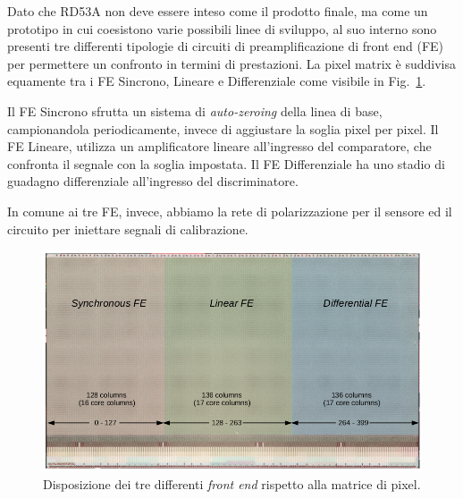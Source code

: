 
Dato che RD53A non deve essere inteso come il prodotto finale, ma come un prototipo in cui coesistono varie possibili linee di sviluppo, al suo interno sono presenti tre differenti tipologie di circuiti di preamplificazione di front end (FE) per permettere un confronto in termini di prestazioni.
La pixel matrix \`e suddivisa equamente tra i FE Sincrono, Lineare e Differenziale come visibile in Fig.~\ref{FrontEnd}. 

Il FE Sincrono sfrutta un sistema di \textit{auto-zeroing} della linea di base, campionandola periodicamente, invece di aggiustare la soglia pixel per pixel. 
Il FE Lineare, utilizza un amplificatore lineare all'ingresso del comparatore, che confronta il segnale con la soglia impostata. 
Il FE Differenziale ha uno stadio di guadagno differenziale all'ingresso del discriminatore. %

In comune ai tre FE, invece, abbiamo la rete di polarizzazione per il sensore ed il circuito per iniettare segnali di calibrazione.
\begin{figure}
\centering
\includegraphics[scale=.3]{Immagini/FrontEnd}
\caption{Disposizione dei tre differenti \textit{front end} rispetto alla matrice di pixel.}
\label{FrontEnd}
\end{figure}


